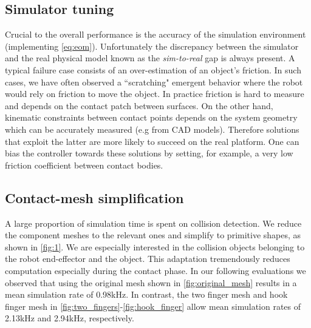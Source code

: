 \subsection{Simulator tuning}
Crucial to the overall performance is the accuracy of the simulation environment (implementing \eqref{eq:eom}). Unfortunately the discrepancy between the simulator and the real physical model known as the \emph{sim-to-real} gap is always present. A typical failure case consists of an over-estimation of an object's friction. In such cases, we have often observed a ``scratching" emergent behavior where the robot would rely on friction to move the object. In practice friction is hard to measure and depends on the contact patch between surfaces. On the other hand, kinematic constraints between contact points depends on the system geometry which can be accurately measured (e.g from CAD models). Therefore solutions that exploit the latter are more likely to succeed on the real platform. One can bias the controller towards these solutions by setting, for example, a very low friction coefficient between contact bodies.

\subsection{Contact-mesh simplification}
A large proportion of simulation time is spent on collision detection. We reduce the component meshes to the relevant ones and simplify to primitive shapes, as shown in \fig\ref{fig:1}. We are especially interested in the collision objects belonging to the robot end-effector and the object. This adaptation tremendously reduces computation especially during the contact phase. In our following evaluations we observed that using the original mesh shown in \fig\ref{fig:original_mesh} results in a mean simulation rate of 0.98kHz. In contrast, the two finger mesh and hook finger mesh in \fig\ref{fig:two_fingers}-\ref{fig:hook_finger} allow mean simulation rates of 2.13kHz and 2.94kHz, respectively.

